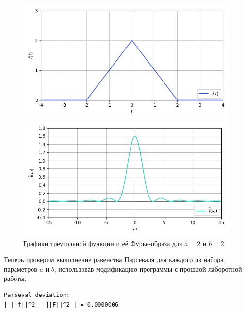 \documentclass[a4paper]{article}
\begin{document}
\begin{figure}[H]
    \begin{minipage}{0.5\textwidth}
        \centering \includegraphics[width=\textwidth]{sources/2_triangular/graph_3.png}
    \end{minipage}\hfill
    \begin{minipage}{0.5\textwidth}
        \centering \includegraphics[width=\textwidth]{sources/2_triangular/fourier_3.png}
    \end{minipage}
    \caption{Графики треугольной функции и её Фурье-образа для $a = 2$ и $b = 2$} 
\end{figure}
\noindent Теперь проверим выполнение равенства Парсеваля для каждого из набора параметров $a$ и $b$, использовав модификацию программы с прошлой лаборотной работы.\\
\begin{minipage}{0.33\textwidth}
\begin{lstlisting}[caption={$a = 1$, $b = 1$}]
Parseval deviation:
| ||f||^2 - ||F||^2 | = 0.0000006
\end{lstlisting}
\end{minipage}\hfill
\end{document}

